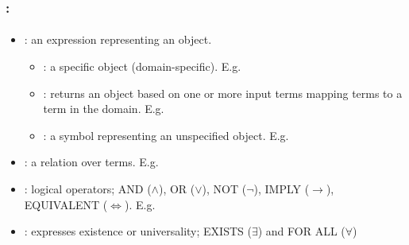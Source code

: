 \documentclass[xcolor=table]{beamer}
\begin{document}
\begin{frame}
	\frametitle{\insertshortsubtitle: \insertsection}
	\framesubtitle{\insertsubsection}
	
	\begin{itemize}
		\item {}: an expression representing an object.
		\begin{itemize}
			\item {}: a specific object (domain-specific).  
			E.g. 
			
			\item {}: returns an object based on one or more input terms mapping terms to a term in the domain.  
			E.g. 
			
			\item {}: a symbol representing an unspecified object.
			E.g. 
		\end{itemize}
		
		\item {}: a relation over terms.
		E.g. 
		
		\item {}: logical operators;
		AND ($\wedge$), OR ($\vee$), NOT ($\neg$), IMPLY ($\rightarrow$), EQUIVALENT ($\Leftrightarrow$).
		E.g. 
		
		\item {}: expresses existence or universality;
		EXISTS ($\exists$) and FOR ALL ($\forall$)  
		
		 
	\end{itemize}
	
\end{frame}
\end{document}
